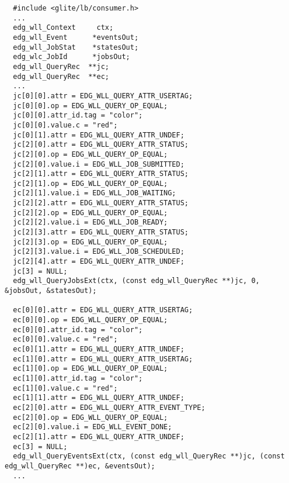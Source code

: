\begin{verbatim}
  #include <glite/lb/consumer.h>
  ...
  edg_wll_Context     ctx;    
  edg_wll_Event      *eventsOut;
  edg_wll_JobStat    *statesOut;
  edg_wlc_JobId      *jobsOut;
  edg_wll_QueryRec  **jc;
  edg_wll_QueryRec  **ec;
  ...
  jc[0][0].attr = EDG_WLL_QUERY_ATTR_USERTAG;
  jc[0][0].op = EDG_WLL_QUERY_OP_EQUAL;
  jc[0][0].attr_id.tag = "color";
  jc[0][0].value.c = "red";
  jc[0][1].attr = EDG_WLL_QUERY_ATTR_UNDEF;
  jc[2][0].attr = EDG_WLL_QUERY_ATTR_STATUS;
  jc[2][0].op = EDG_WLL_QUERY_OP_EQUAL;
  jc[2][0].value.i = EDG_WLL_JOB_SUBMITTED;
  jc[2][1].attr = EDG_WLL_QUERY_ATTR_STATUS;
  jc[2][1].op = EDG_WLL_QUERY_OP_EQUAL;
  jc[2][1].value.i = EDG_WLL_JOB_WAITING;
  jc[2][2].attr = EDG_WLL_QUERY_ATTR_STATUS;
  jc[2][2].op = EDG_WLL_QUERY_OP_EQUAL;
  jc[2][2].value.i = EDG_WLL_JOB_READY;
  jc[2][3].attr = EDG_WLL_QUERY_ATTR_STATUS;
  jc[2][3].op = EDG_WLL_QUERY_OP_EQUAL;
  jc[2][3].value.i = EDG_WLL_JOB_SCHEDULED;
  jc[2][4].attr = EDG_WLL_QUERY_ATTR_UNDEF;
  jc[3] = NULL;
  edg_wll_QueryJobsExt(ctx, (const edg_wll_QueryRec **)jc, 0, &jobsOut, &statesOut);

  ec[0][0].attr = EDG_WLL_QUERY_ATTR_USERTAG;
  ec[0][0].op = EDG_WLL_QUERY_OP_EQUAL;
  ec[0][0].attr_id.tag = "color";
  ec[0][0].value.c = "red";
  ec[0][1].attr = EDG_WLL_QUERY_ATTR_UNDEF;
  ec[1][0].attr = EDG_WLL_QUERY_ATTR_USERTAG;
  ec[1][0].op = EDG_WLL_QUERY_OP_EQUAL;
  ec[1][0].attr_id.tag = "color";
  ec[1][0].value.c = "red";
  ec[1][1].attr = EDG_WLL_QUERY_ATTR_UNDEF;
  ec[2][0].attr = EDG_WLL_QUERY_ATTR_EVENT_TYPE;
  ec[2][0].op = EDG_WLL_QUERY_OP_EQUAL;
  ec[2][0].value.i = EDG_WLL_EVENT_DONE;
  ec[2][1].attr = EDG_WLL_QUERY_ATTR_UNDEF;
  ec[3] = NULL;
  edg_wll_QueryEventsExt(ctx, (const edg_wll_QueryRec **)jc, (const edg_wll_QueryRec **)ec, &eventsOut);
  ...
\end{verbatim}
\fi

